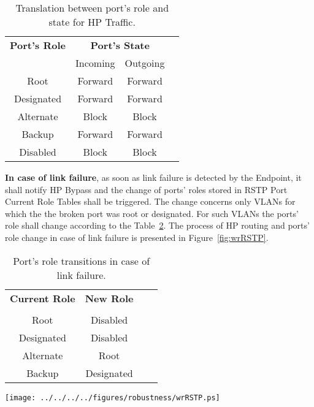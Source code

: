 \begin{table}[ht]
\caption{Translation between port's role and state for HP Traffic.} 
\centering
	\begin{tabular}{| c | c | c | c |}          \hline
\textbf{Port's Role}& \multicolumn{2}{|c|}{\textbf{Port's State}}  \\
                    & Incoming   & Outgoing     \\ \hline
Root                & Forward    & Forward      \\ \hline
Designated          & Forward    & Forward      \\ \hline
Alternate           & Block      & Block        \\ \hline
Backup              & Forward    & Forward      \\ \hline
Disabled            & Block      & Block        \\ \hline
\end{tabular}
\label{tab:portRoleStatetrans}
\end{table}

\textbf{In case of link failure}, as soon as link failure is detected by the
Endpoint, it shall notify HP Bypass and the change of ports' roles stored in
RSTP Port Current Role Tables shall be triggered. The change concerns only VLANs
for which the the broken port was root or designated. For such VLANs the ports'
role shall change according to the Table~\ref{tab:portRoleTransition}.
The process of HP routing and ports' role change in case of link failure is
presented in Figure~\ref{fig:wrRSTP}.

\begin{table}[ht]
\caption{Port's role transitions in case of link failure.} 
\centering
	\begin{tabular}{| c | c | c | c |}          \hline
\textbf{Current Role}& \textbf{New Role}  \\
                     &               \\ \hline
Root                 & Disabled      \\ \hline
Designated           & Disabled      \\ \hline
Alternate            & Root          \\ \hline
Backup               & Designated    \\ \hline
\end{tabular}
\label{tab:portRoleTransition}
\end{table}

\begin{center}
	\texttt{[image: ../../../../figures/robustness/wrRSTP.ps]}
	\label{fig:wrRSTP}
\end{center}
